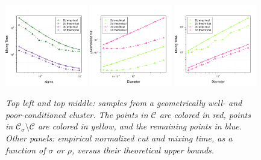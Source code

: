 \documentclass{article}
\newcommand{\1}{\mathbf{1}}
\newcommand{\Cset}{\mathcal{C}}
\newcommand{\Csig}{\Cset_{\sigma}}
\theoremstyle{aldenthm}
\theoremstyle{aldenrmrk}
\begin{document}
\begin{figure}[tb]
  \includegraphics[width=0.32\textwidth]{example1plots/sigma_mixing_time_plot}
  \includegraphics[width=0.32\textwidth]{example1plots/diameter_normalized_cut_plot}
  \includegraphics[width=0.32\textwidth]{example1plots/diameter_mixing_time_plot}
  \caption{\it\small Top left and top middle: samples from a geometrically
    well- and poor-conditioned cluster. The points in $\Cset$ are colored in 
    red, points in $\Csig \setminus \Cset$ are colored in yellow, and the
    remaining points in blue. Other panels: empirical normalized cut and mixing
    time, as a function of $\sigma$ or $\rho$, versus their theoretical upper
    bounds.} 
  \label{fig:fig1}
\end{figure}
\end{document}
